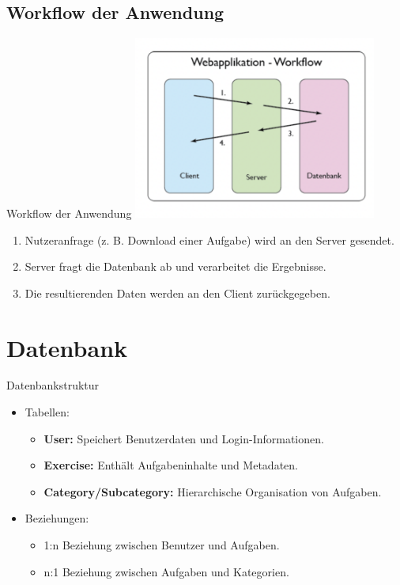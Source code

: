\documentclass{beamer}
\begin{document}
\subsection{Workflow der Anwendung}
\begin{frame}{Workflow der Anwendung}
    \includegraphics[width=0.6\textwidth]{workflow.png}
    \begin{enumerate}
        \item Nutzeranfrage (z. B. Download einer Aufgabe) wird an den Server gesendet.
        \item Server fragt die Datenbank ab und verarbeitet die Ergebnisse.
        \item Die resultierenden Daten werden an den Client zurückgegeben.
    \end{enumerate}
\end{frame}

\section{Datenbank}
\begin{frame}{Datenbankstruktur}
    \begin{itemize}
        \item Tabellen:
        \begin{itemize}
            \item \textbf{User:} Speichert Benutzerdaten und Login-Informationen.
            \item \textbf{Exercise:} Enthält Aufgabeninhalte und Metadaten.
            \item \textbf{Category/Subcategory:} Hierarchische Organisation von Aufgaben.
        \end{itemize}
        \item Beziehungen:
        \begin{itemize}
            \item 1:n Beziehung zwischen Benutzer und Aufgaben.
            \item n:1 Beziehung zwischen Aufgaben und Kategorien.
        \end{itemize}
    \end{itemize}
\end{frame}
\end{document}
